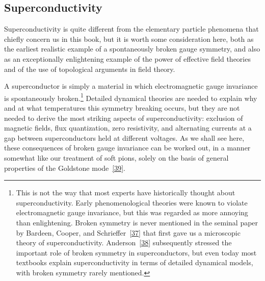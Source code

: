 \subsection[Superconductivity]{Superconductivity\footnotemark}
\label{sec:21.6}

Superconductivity is quite different from the elementary particle phenomena that chiefly concern us in this book, but it is worth some consideration here, both as the earliest realistic example of a spontaneously broken gauge symmetry, and also as an exceptionally enlightening example of the power of effective field theories and of the use of topological arguments in field theory.

A superconductor is simply a material in which electromagnetic gauge invariance is spontaneously broken.\footnote{This is not the way that most experts have historically thought about superconductivity. Early phenomenological theories were known to violate electromagnetic gauge invariance, but this was regarded as more annoying than enlightening. Broken symmetry is never mentioned in the seminal paper by Bardeen, Cooper, and Schrieffer~\hyperref[ch21-ref-37]{[37]} that first gave us a microscopic theory of superconductivity. Anderson~\hyperref[ch21-ref-38]{[38]} subsequently stressed the important role of broken symmetry in superconductors, but even today most textbooks explain superconductivity in terms of detailed dynamical models, with broken symmetry rarely mentioned.} Detailed dynamical theories are needed to explain why and at what temperatures this symmetry breaking occurs, but they are not needed to derive the most striking aspects of superconductivity: exclusion of magnetic fields, flux quantization, zero resistivity, and alternating currents at a gap between superconductors held at different voltages. As we shall see here, these consequences of broken gauge invariance can be worked out, in a manner somewhat like our treatment of soft pions, solely on the basis of general properties of the Goldstone mode~\hyperref[ch21-ref-39]{[39]}.


